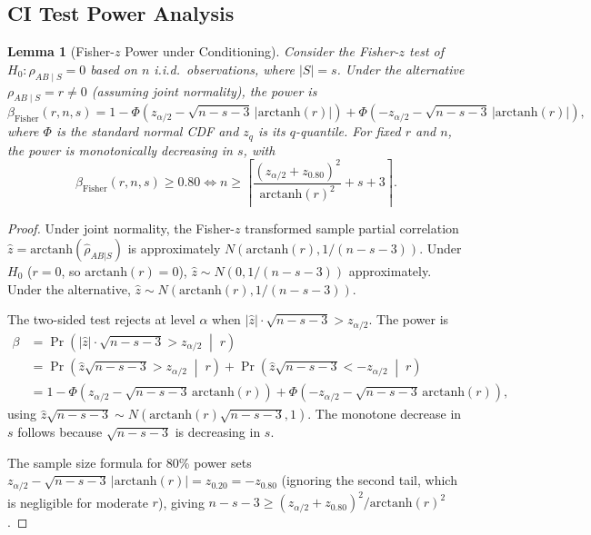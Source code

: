 \documentclass[11pt,a4paper]{article}
\newtheorem{lemma}[theorem]{Lemma}
\theoremstyle{definition}
\theoremstyle{remark}
\newcommand{\Phi}{\varPhi}
\begin{document}
\subsection{CI Test Power Analysis}\label{sec:power_theory}

\begin{lemma}[Fisher-$z$ Power under Conditioning]\label{lem:fisher_power}
Consider the Fisher-$z$ test of $H_0 : \rho_{AB \mid S} = 0$ based on $n$
i.i.d.\ observations, where $|S| = s$. Under the alternative
$\rho_{AB \mid S} = r \neq 0$ (assuming joint normality), the power is
\[
  \beta_{\mathrm{Fisher}}(r, n, s) = 1 - \Phi\!\left(z_{\alpha/2} -
  \sqrt{n - s - 3}\,|\mathrm{arctanh}(r)|\right) + \Phi\!\left(-z_{\alpha/2}
  - \sqrt{n - s - 3}\,|\mathrm{arctanh}(r)|\right),
\]
where $\Phi$ is the standard normal CDF and $z_q$ is its $q$-quantile.
For fixed $r$ and $n$, the power is monotonically decreasing in $s$, with
\[
  \beta_{\mathrm{Fisher}}(r, n, s) \geq 0.80 \iff
  n \geq \left\lceil\frac{(z_{\alpha/2} + z_{0.80})^2}{\mathrm{arctanh}(r)^2}
  + s + 3\right\rceil.
\]
\end{lemma}

\begin{proof}
Under joint normality, the Fisher-$z$ transformed sample partial correlation
$\hat{z} = \mathrm{arctanh}(\hat{\rho}_{AB|S})$ is approximately
$N(\mathrm{arctanh}(r), 1/(n - s - 3))$. Under $H_0$ ($r = 0$, so
$\mathrm{arctanh}(r) = 0$), $\hat{z} \sim N(0, 1/(n-s-3))$ approximately.
Under the alternative, $\hat{z} \sim N(\mathrm{arctanh}(r), 1/(n-s-3))$.

The two-sided test rejects at level $\alpha$ when
$|\hat{z}| \cdot \sqrt{n - s - 3} > z_{\alpha/2}$. The power is
\begin{align*}
  \beta &= \Pr\!\left(|\hat{z}| \cdot \sqrt{n-s-3} > z_{\alpha/2}
  \;\middle|\; r\right) \\
  &= \Pr\!\left(\hat{z}\sqrt{n-s-3} > z_{\alpha/2} \;\middle|\; r\right)
  + \Pr\!\left(\hat{z}\sqrt{n-s-3} < -z_{\alpha/2} \;\middle|\; r\right) \\
  &= 1 - \Phi\!\left(z_{\alpha/2} - \sqrt{n-s-3}\,\mathrm{arctanh}(r)\right)
  + \Phi\!\left(-z_{\alpha/2} - \sqrt{n-s-3}\,\mathrm{arctanh}(r)\right),
\end{align*}
using $\hat{z}\sqrt{n-s-3} \sim N(\mathrm{arctanh}(r)\sqrt{n-s-3}, 1)$.
The monotone decrease in $s$ follows because $\sqrt{n-s-3}$ is decreasing in $s$.

The sample size formula for 80\% power sets
$z_{\alpha/2} - \sqrt{n-s-3}\,|\mathrm{arctanh}(r)| = z_{0.20} = -z_{0.80}$
(ignoring the second tail, which is negligible for moderate $r$), giving
$n - s - 3 \geq (z_{\alpha/2} + z_{0.80})^2 / \mathrm{arctanh}(r)^2$.
\end{proof}
\end{document}
